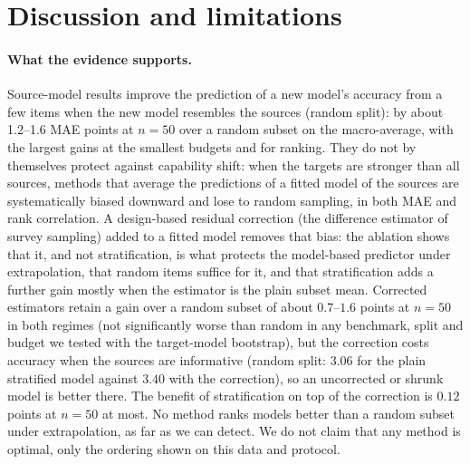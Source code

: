 \section{Discussion and limitations}
\label{sec:disc}

\paragraph{What the evidence supports.}
Source-model results improve the prediction of a new model's accuracy from a few items when the new model resembles the sources (random split): by about 1.2--1.6 MAE points at $n{=}50$ over a random subset on the macro-average, with the largest gains at the smallest budgets and for ranking. They do not by themselves protect against capability shift: when the targets are stronger than all sources, methods that average the predictions of a fitted model of the sources are systematically biased downward and lose to random sampling, in both MAE and rank correlation. A design-based residual correction (the difference estimator of survey sampling) added to a fitted model removes that bias: the ablation shows that it, and not stratification, is what protects the model-based predictor under extrapolation, that random items suffice for it, and that stratification adds a further gain mostly when the estimator is the plain subset mean. Corrected estimators retain a gain over a random subset of about $0.7$--$1.6$ points at $n{=}50$ in both regimes (not significantly worse than random in any benchmark, split and budget we tested with the target-model bootstrap), but the correction costs accuracy when the sources are informative (random split: $3.06$ for the plain stratified model against $3.40$ with the correction), so an uncorrected or shrunk model is better there. The benefit of stratification on top of the correction is $0.12$ points at $n{=}50$ at most. No method ranks models better than a random subset under extrapolation, as far as we can detect. We do not claim that any method is optimal, only the ordering shown on this data and protocol.


